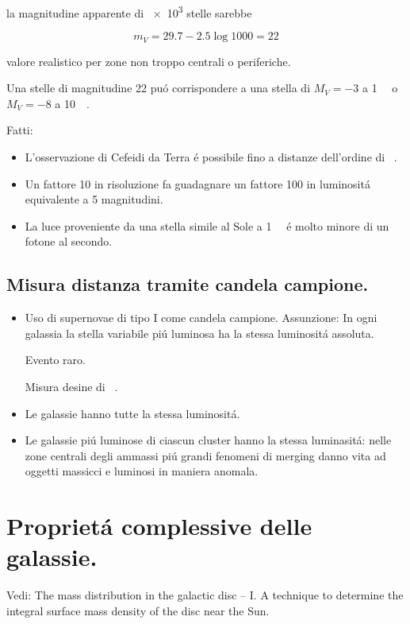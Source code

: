 la magnitudine apparente di \num{e3} stelle sarebbe 

\begin{equation*}
m_V=29.7-2.5\log{1000}=22
\end{equation*}

valore realistico per zone non troppo centrali o periferiche.

Una stelle di magnitudine 22 pu\'o corrispondere a una stella di $M_V=-3$ a \SI{1}{\mega\parsec} o $M_V=-8$ a \SI{10}{\mega\parsec}.

Fatti:
\begin{itemize}
    \item L'osservazione di Cefeidi da Terra \'e possibile fino a distanze dell'ordine di \si{\mega\parsec}.
    \item Un fattore 10 in risoluzione fa guadagnare un fattore 100 in luminosit\'a equivalente a 5 magnitudini.
    \item La luce proveniente da una stella simile al Sole a \SI{1}{\mega\parsec} \'e molto minore di un fotone al secondo.
\end{itemize}


\subsection{Misura distanza tramite candela campione.}

\begin{itemize}
    \item Uso di supernovae di tipo I come candela campione. Assunzione: In ogni galassia la stella variabile pi\'u luminosa ha la stessa luminosit\'a assoluta.
    
    Evento raro.
    
    Misura desine di \si{\mega\parsec}.
    \item Le galassie hanno tutte la stessa luminosit\'a.
    \item Le galassie pi\'u luminose di ciascun cluster hanno la stessa luminasit\'a: nelle zone centrali degli ammassi pi\'u grandi fenomeni di merging danno vita ad oggetti massicci e luminosi in maniera anomala.
\end{itemize}

\section{Propriet\'a complessive delle galassie.}
Vedi: The mass distribution in the galactic disc – I. A technique to determine the integral surface mass density of the disc near the Sun.

